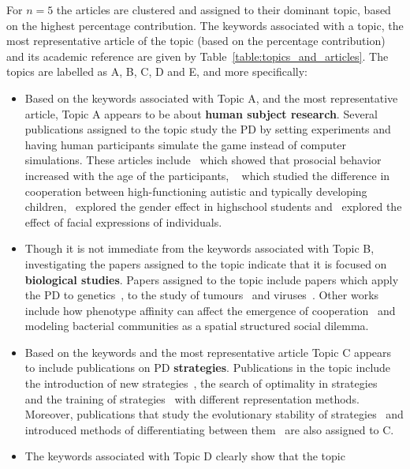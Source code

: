 \documentclass{article}
\theoremstyle{definition}
\begin{document}
For \(n=5\) the articles are clustered and assigned to their dominant topic,
based on the highest percentage contribution. The keywords associated with a
topic, the most representative article of the topic (based on the
percentage contribution) and its academic reference are given by
Table~\ref{table:topics_and_articles}. The topics are labelled as A, B, C, D and
E, and more specifically:

\begin{itemize}
    \item Based on the keywords associated with Topic A, and the most
    representative article, Topic A appears to be about \textbf{human subject
    research}. Several publications assigned to the topic study the PD by
    setting experiments and having human participants simulate the game
    instead of computer simulations. These articles include~\cite{Matsumoto2016}
    which showed that prosocial behavior increased with the age of the
    participants, ~\cite{Li2014} which studied the difference in cooperation
    between high-functioning autistic and typically developing
    children,~\cite{Molina2013} explored the gender effect in highschool
    students and~\cite{Bell2017} explored the effect of facial expressions of
    individuals.
    \item Though it is not immediate from the keywords associated with
    Topic B, investigating the papers assigned to the topic indicate that it
    is focused on \textbf{biological studies}. Papers assigned to the topic include
    papers which apply the PD to genetics~\cite{Sistrom2015}, to
    the study of tumours~\cite{sartakhti2017} and
    viruses~\cite{Turner1999}. Other works include how phenotype affinity
    can affect the emergence of cooperation~\cite{wu2019phenotype} and modeling
    bacterial communities as a spatial structured social dilemma.
    \item Based on the keywords and the most representative article Topic
    C appears to include publications on PD \textbf{strategies}. Publications
    in the topic include the introduction of new strategies~\cite{stewart2013extortion},
    the search of optimality in strategies~\cite{banerjee2007reaching} and the
    training of strategies~\cite{ishibuchi2011evolution} with different
    representation methods. Moreover, publications that study the evolutionary
    stability of strategies~\cite{adami2013evolutionary} and introduced methods
    of differentiating between them~\cite{ashlock2008fingerprinting} are
    also assigned to C.
    \item The keywords associated with Topic D clearly show that the topic

\end{itemize}
\end{document}
